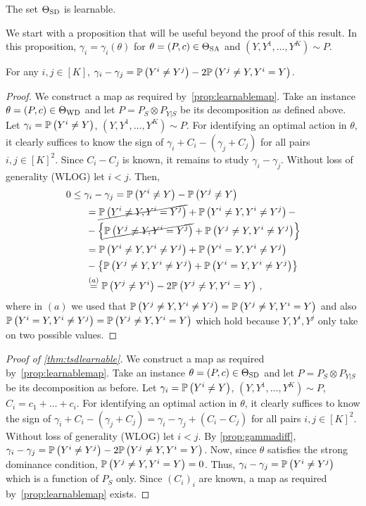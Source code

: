 \begin{thm}
\label{thm:tsdlearnable}
The set $\Theta_{\mathrm{SD}}$ is learnable.
\end{thm}
We start with a proposition that will be useful beyond the proof of this result.
In this proposition, $\gamma_i = \gamma_i(\theta)$ for $\theta=(P,c)\in \Theta_{\mathrm{SA}}$ and $(Y,Y^1,\dots,Y^K) \sim P$.
\begin{prop}\label{prop:gammadiff}
For any $i,j\in [K]$, $\gamma_i - \gamma_j = \mathbb{P}\left(Y^i\ne Y^j\right) - 2\mathbb{P}\left( Y^j \ne Y, Y^i=Y\right)$.
\end{prop}
\begin{proof}

We construct a map as required by~\cref{prop:learnablemap}.
Take an instance $\theta = (P,c)\in \Theta_{\mathrm{WD}}$ and let $P = P_S \otimes P_{Y|S}$ be its decomposition
as defined above.
Let $\gamma_i = \mathbb{P}\left(Y^i \ne Y\right)$, $(Y,Y^1,\dots,Y^K)\sim P$.
For identifying an optimal action in $\theta$, it clearly suffices
to know the sign of $\gamma_i + C_i - (\gamma_j +C_j)$ for all pairs $i,j\in [K]^2$.
Since $C_i - C_j$ is known, it remains to study $\gamma_i-\gamma_j$.
Without loss of generality (WLOG) let $i<j$.
Then, 
\begin{align*}
\MoveEqLeft 0  \le \gamma_i  - \gamma_j = \Prob{Y^i\ne Y} - \Prob{Y^j\ne Y} \\
& = \cancel{\Prob{Y^i\ne Y, Y^i=Y^j}} + \Prob{ Y^i\ne Y, Y^i\ne Y^j } - \\
& - \left\{ 
       \cancel{\Prob{Y^j\ne Y, Y^i=Y^j}} + \Prob{ Y^j\ne Y, Y^i\ne Y^j }\right\}\\
& = \Prob{ Y^i\ne Y, Y^i \ne Y^j } + \Prob{Y^i=Y,Y^i\ne Y^j}       \\
& - \left\{ 
	  \Prob{ Y^j \ne Y, Y^i\ne Y^j } + \Prob{ Y^i=Y,Y^i\ne Y^j}
	 \right\}\\
& \stackrel{\footnotesize (a)}{=} \Prob{ Y^j \ne Y^i } -2 \Prob{ Y^j\ne Y, Y^i = Y }\,,
\end{align*}
where in $(a)$ we used that $\mathbb{P}\left( Y^j \ne Y, Y^i\ne Y^j \right) =  \mathbb{P}\left( Y^j\ne Y,Y^i= Y\right)$ and also
$\mathbb{P}\left( Y^i=Y,Y^i\ne Y^j\right) = \mathbb{P}\left( Y^j\ne Y,Y^i= Y\right)$
which hold because $Y,Y^i,Y^j$ only take on two possible values.
\end{proof}
\begin{proof}[Proof of \cref{thm:tsdlearnable}]
We construct a map as required by~\cref{prop:learnablemap}.
Take an instance $\theta = (P,c)\in \Theta_{\mathrm{SD}}$ and let $P = P_S \otimes P_{Y|S}$ be its decomposition as before.
Let $\gamma_i = \mathbb{P}\left(Y^i \ne Y\right)$, $(Y,Y^1,\dots,Y^K)\sim P$, $C_i = c_1+\dots+c_i$.
For identifying an optimal action in $\theta$, it clearly suffices
to know the sign of $\gamma_i + C_i - (\gamma_j +C_j) = \gamma_i-\gamma_j + (C_i-C_j)$ for all pairs $i,j\in [K]^2$.
Without loss of generality (WLOG) let $i<j$. By \cref{prop:gammadiff},
$\gamma_i - \gamma_j = \mathbb{P}\left( Y^i \ne Y^j \right) -2 \mathbb{P}\left( Y^j\ne Y, Y^i = Y \right)$.
Now, since $\theta$ satisfies the strong dominance condition, $ \mathbb{P}\left( Y^j\ne Y, Y^i = Y \right) = 0$.
Thus, $\gamma_i - \gamma_j = \mathbb{P}\left( Y^i \ne Y^j \right)$
which is a function of $P_S$ only.
Since $(C_i)_i$ are known, a map as required by~\cref{prop:learnablemap} exists.
\end{proof}
